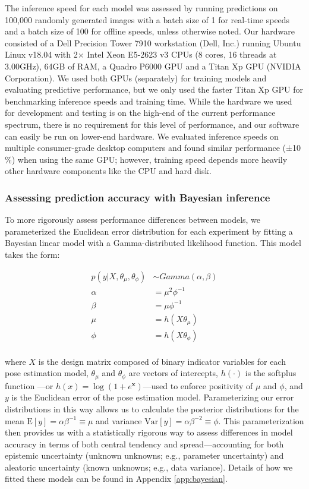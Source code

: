 \documentclass[11pt,a4paper,oneside]{article}
\begin{document}
The inference speed for each model was assessed by running predictions on 100,000 randomly generated images with a batch size of 1 for real-time speeds and a batch size of 100 for offline speeds, unless otherwise noted. Our hardware consisted of a Dell Precision Tower 7910 workstation (Dell, Inc.) running Ubuntu Linux v18.04 with 2$\times$ Intel Xeon E5-2623 v3 CPUs (8 cores, 16 threads at 3.00GHz), 64GB of RAM, a Quadro P6000 GPU and a Titan Xp GPU (NVIDIA Corporation). We used both GPUs (separately) for training models and evaluating predictive performance, but we only used the faster Titan Xp GPU for benchmarking inference speeds and training time. While the hardware we used for development and testing is on the high-end of the current performance spectrum, there is no requirement for this level of performance, and our software can easily be run on lower-end hardware. We evaluated inference speeds on multiple consumer-grade desktop computers and found similar performance (±10$\%$) when using the same GPU; however, training speed depends more heavily other hardware components like the CPU and hard disk. 

\subsubsection{Assessing prediction accuracy with Bayesian inference}
To more rigorously assess performance differences between models, we parameterized the Euclidean error distribution for each experiment by fitting a Bayesian linear model with a Gamma-distributed likelihood function. This model takes the form:

\begin{align*}
p(y|X,\theta_{\mu},\theta_{\phi}) &\sim Gamma(\alpha, \beta)\\
\alpha &= \mu^{2}\phi^{-1}\\
\beta &= \mu\phi^{-1}\\
\mu &= h(X\theta_{\mu})\\
\phi &= h(X\theta_{\phi})\\
\end{align*}

where $X$ is the design matrix composed of binary indicator variables for each pose estimation model, $\theta_{\mu}$ and $\theta_{\phi}$ are vectors of intercepts, $h(\cdot)$ is the softplus function \citep{dugas2001incorporating}—or $h(x) = \log{(1+e^{\mathbf{x}})}$—used to enforce positivity of $\mu$ and $\phi$, and $y$ is the Euclidean error of the pose estimation model. Parameterizing our error distributions in this way allows us to calculate the posterior distributions for the mean $\mathrm{E}[y] = \alpha\beta^{-1} \equiv \mu$ and variance $\mathrm{Var}[y] = \alpha\beta^{-2} \equiv \phi$. This parameterization then provides us with a statistically rigorous way to assess differences in model accuracy in terms of both central tendency and spread—accounting for both epistemic uncertainty (unknown unknowns; e.g., parameter uncertainty) and aleatoric uncertainty (known unknowns; e.g., data variance). Details of how we fitted these models can be found in Appendix \ref{app:bayesian}.
\end{document}
